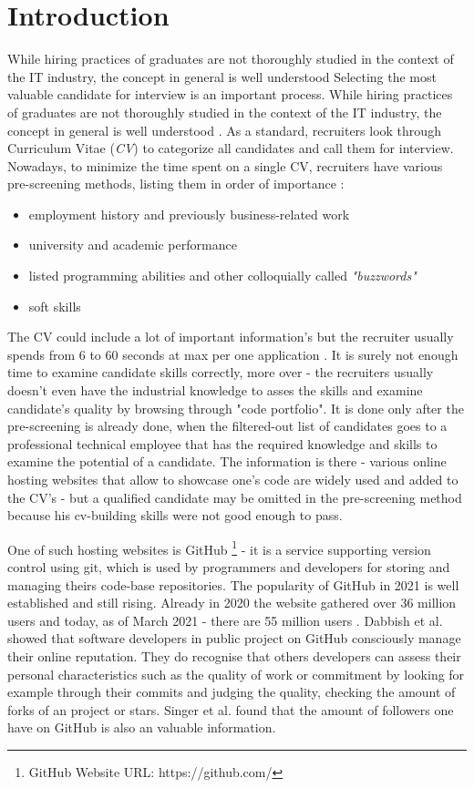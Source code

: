 \section{Introduction}

While hiring practices of graduates are not thoroughly studied in the context of
the IT industry, the concept in general is well understood
Selecting the most valuable candidate for interview is an important process. While hiring practices of graduates are not thoroughly studied in the context of the IT industry, the concept in general is well understood \cite{HiringProcess}. As a standard, recruiters look through Curriculum Vitae (\emph{CV}) to categorize all candidates and call them for interview. Nowadays, to minimize the time spent on a single CV, recruiters have various pre-screening methods, listing them in order of importance \cite{SantanderCVLectureScholarship}:
\begin{itemize}
  \item employment history and previously business-related work
  \item university and academic performance
  \item listed programming abilities and other colloquially called \emph{"buzzwords"}
  \item soft skills
\end{itemize}

The CV could include a lot of important information's but the recruiter usually spends from 6 to 60 seconds at max per one application \cite{SantanderCVLectureScholarship}. It is surely not enough time to examine candidate skills correctly, more over - the recruiters usually doesn't even have the industrial knowledge to asses the skills and examine candidate's quality by browsing through "code portfolio". It is done only after the pre-screening is already done, when the filtered-out list of candidates goes to a professional technical employee that has the required knowledge and skills to examine the potential of a candidate. The information is there - various online hosting websites that allow to showcase one's code are widely used and added to the CV's - but a qualified candidate may be omitted in the pre-screening method because his cv-building skills were not good enough to pass.

One of such hosting websites is GitHub \footnote{GitHub Website URL: https://github.com/} - it is a service supporting version control using git, which is used by programmers and developers for storing and managing theirs code-base repositories. The popularity of GitHub in 2021 is well established and still rising. Already in 2020 the website gathered over 36 million users \cite{GitHubUsers2020} and today, as of March 2021 - there are 55 million users \cite{GitHubUsers2021}. Dabbish et al. \cite{DabbishC} showed that software developers in public project on GitHub consciously manage their online reputation. They do recognise that others developers can assess their personal characteristics such as the quality of work or commitment by looking for example through their commits and judging the quality, checking the amount of forks of an project or stars. Singer et al. \cite{Singer} found that the amount of followers one have on GitHub is also an valuable information.

